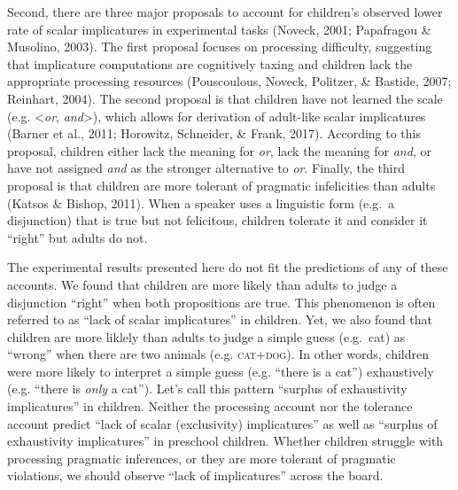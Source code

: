 \documentclass[,man,floatsintext]{apa6}
\begin{document}
Second, there are three major proposals to account for children's observed lower rate of scalar implicatures in experimental tasks (Noveck, 2001; Papafragou \& Musolino, 2003). The first proposal focuses on processing difficulty, suggesting that implicature computations are cognitively taxing and children lack the appropriate processing resources (Pouscoulous, Noveck, Politzer, \& Bastide, 2007; Reinhart, 2004). The second proposal is that children have not learned the scale (e.g. \textless{}\emph{or}, \emph{and}\textgreater{}), which allows for derivation of adult-like scalar implicatures (Barner et al., 2011; Horowitz, Schneider, \& Frank, 2017). According to this proposal, children either lack the meaning for \emph{or}, lack the meaning for \emph{and}, or have not assigned \emph{and} as the stronger alternative to \emph{or}. Finally, the third proposal is that children are more tolerant of pragmatic infelicities than adults (Katsos \& Bishop, 2011). When a speaker uses a linguistic form (e.g.~a disjunction) that is true but not felicitous, children tolerate it and consider it \enquote{right} but adults do not.

The experimental results presented here do not fit the predictions of any of these accounts. We found that children are more likely than adults to judge a disjunction \enquote{right} when both propositions are true. This phenomenon is often referred to as \enquote{lack of scalar implicatures} in children. Yet, we also found that children are more liklely than adults to judge a simple guess (e.g.~cat) as \enquote{wrong} when there are two animals (e.g. \textsc{cat+dog}). In other words, children were more likely to interpret a simple guess (e.g. \enquote{there is a cat}) exhaustively (e.g. \enquote{there is \emph{only} a cat}). Let's call this pattern \enquote{surplus of exhaustivity implicatures} in children. Neither the processing account nor the tolerance account predict \enquote{lack of scalar (exclusivity) implicatures} as well as \enquote{surplus of exhaustivity implicatures} in preschool children. Whether children struggle with processing pragmatic inferences, or they are more tolerant of pragmatic violations, we should observe \enquote{lack of implicatures} across the board.
\end{document}
